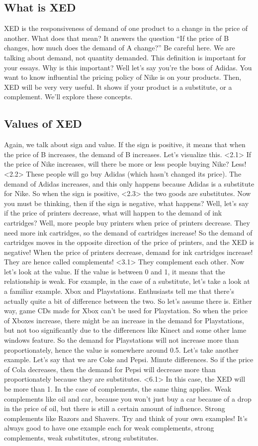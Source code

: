 \documentclass[DIV=calc,11pt,parskip,numbers=noenddot]{scrartcl} %
\begin{document}
\subsection{What is XED}
XED is the responsiveness of demand of one product to a change in the price of another. What does that mean? It answers the question “If the price of B changes, how much does the demand of A change?” Be careful here. We are talking about demand, not quantity demanded. This definition is important for your essays. Why is this important? Well let’s say you’re the boss of Adidas. You want to know influential the pricing policy of Nike is on your products. Then, XED will be very very useful. It shows if your product is a substitute, or a complement. We’ll explore these concepts.
\subsection{Values of XED}
Again, we talk about sign and value. If the sign is positive, it means that when the price of B increases, the demand of B increases. Let’s visualize this. <2.1> If the price of Nike increases, will there be more or less people buying Nike? Less! <2.2> These people will go buy Adidas (which hasn’t changed its price). The demand of Adidas increases, and this only happens because Adidas is a substitute for Nike. So when the sign is positive, <2.3> the two goods are substitutes.  Now you must be thinking, then if the sign is negative, what happens? Well, let’s say if the price of printers decrease, what will happen to the demand of ink cartridges? Well, more people buy printers when price of printers decrease. They need more ink cartridges, so the demand of cartridges increase! So the demand of cartridges moves in the opposite direction of the price of printers, and the XED is negative! When the price of printers decrease, demand for ink cartridges increase! They are hence called complements! <3.1> They complement each other. 
Now let’s look at the value. If the value is between 0 and 1, it means that the relationship is weak. For example, in the case of a substitute, let’s take a look at a familiar example. Xbox and Playstations. Enthusiasts tell me that there’s actually quite a bit of difference between the two. So let’s assume there is. Either way, game CDs made for Xbox can’t be used for Playstation. So when the price of Xboxes increase, there might be an increase in the demand for Playstations, but not too significantly due to the differences like Kinect and some other lame windows feature. So the demand for Playstations will not increase more than proportionately, hence the value is somewhere around 0.5. Let’s take another example. Let’s say that we are Coke and Pepsi. Minute differences. So if the price of Cola decreases, then the demand for Pepsi will decrease more than proportionately because they are substitutes. <6.1> In this case, the XED will be more than 1. In the case of complements, the same thing applies. Weak complements like oil and car, because you won’t just buy a car because of a drop in the price of oil, but there is still a certain amount of influence. Strong complements like Razors and Shavers. Try and think of your own examples! It’s always good to have one example each for weak complements, strong complements, weak substitutes, strong substitutes.
\end{document}
